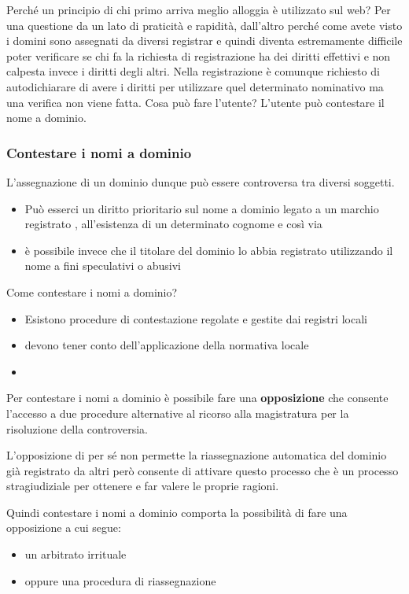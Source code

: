 Perché un principio di chi primo arriva meglio alloggia è utilizzato sul web? Per una questione da un lato di praticità e rapidità, dall'altro perché come avete visto i domini sono assegnati da diversi registrar e quindi diventa estremamente difficile poter verificare se chi fa la richiesta di registrazione ha dei diritti effettivi e non calpesta invece i diritti degli altri. Nella registrazione è comunque richiesto di autodichiarare di avere i diritti per utilizzare quel determinato nominativo ma una verifica non viene fatta. Cosa può fare l'utente? L'utente può contestare il nome a dominio.

\subsubsection{Contestare i nomi a dominio}

L'assegnazione di un dominio dunque può essere controversa tra diversi soggetti.
\begin{itemize}
    \item Può esserci un diritto prioritario sul nome a dominio legato a un marchio registrato , all'esistenza di un determinato cognome e così via
    \item è possibile invece che il titolare del dominio lo abbia registrato utilizzando il nome a fini speculativi o abusivi
\end{itemize}

Come contestare i nomi a dominio?
\begin{itemize}
    \item Esistono procedure di contestazione regolate e gestite dai registri locali
    \item devono tener conto dell'applicazione della normativa locale
    \item
\end{itemize}

Per contestare i nomi a dominio è possibile fare una \textbf{opposizione} che consente l'accesso a due procedure alternative al ricorso alla magistratura per la risoluzione della controversia. \par
L'opposizione di per sé non permette la riassegnazione automatica del dominio già registrato da altri però consente di attivare questo processo che è un processo stragiudiziale per ottenere e far valere le proprie ragioni. \par
Quindi contestare i nomi a dominio comporta la possibilità di fare una opposizione a cui segue:
\begin{itemize}
    \item un arbitrato irrituale
    \item oppure una procedura di riassegnazione
\end{itemize}

